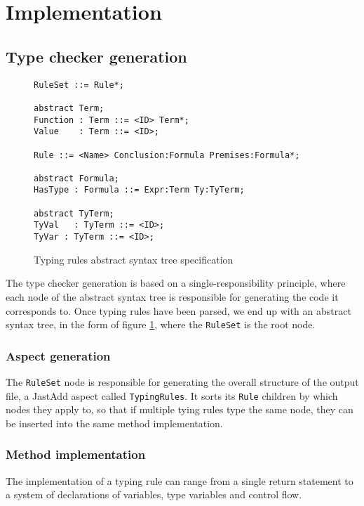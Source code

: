 \documentclass[nofilelist]{cslthse-msc}
\begin{document}
\cite{Hedin2011}
\section{Implementation} %
\subsection{Type checker generation}
\begin{figure}[h]
\begin{lstlisting}[]
RuleSet ::= Rule*;

abstract Term;
Function : Term ::= <ID> Term*;
Value    : Term ::= <ID>;

Rule ::= <Name> Conclusion:Formula Premises:Formula*;

abstract Formula;
HasType : Formula ::= Expr:Term Ty:TyTerm;

abstract TyTerm;
TyVal   : TyTerm ::= <ID>;
TyVar : TyTerm ::= <ID>;
\end{lstlisting}
  \caption{Typing rules abstract syntax tree specification}
  \label{trastspec}
\end{figure}

The type checker generation is based on a single-responsibility principle, where each node of the abstract syntax tree is responsible for generating the code it corresponds to.
Once typing rules have been parsed, we end up with an abstract syntax tree, in the form of figure \ref{trastspec}, where the \verb|RuleSet| is the root node.

\subsubsection{Aspect generation}
The \verb|RuleSet| node is responsible for generating the overall structure of the output file, a JastAdd aspect called \verb|TypingRules|.
It sorts its \verb|Rule| children by which nodes they apply to, so that if multiple tying rules type the same node, they can be inserted into the same method implementation.

\subsubsection{Method implementation}
The implementation of a typing rule can range from a single return statement to a system of declarations of variables, type variables and control flow.
\end{document}
